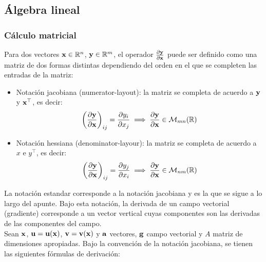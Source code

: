 \subsection{Álgebra lineal}

\subsubsection{Cálculo matricial}

Para dos vectores $\mathbf{x}\in\mathbb{R}^n$, $\mathbf{y}\in\mathbb{R}^m$, el operador $\frac{\partial \mathbf{y}}{\partial \mathbf{x}}$ puede ser definido como una matriz de dos formas distintas dependiendo del orden en el que se completen las entradas de la matriz:

\begin{itemize}
	\item Notación jacobiana (numerator-layout): la matriz se completa de acuerdo a $\mathbf{y}$ y $\mathbf{x}^\top $, es decir:
	\begin{equation*}
		\left(\frac{\partial \mathbf{y}}{\partial \mathbf{x}}\right)_{ij} = \frac{\partial y_i}{\partial x_j} \implies \frac{\partial \mathbf{y}}{\partial \mathbf{x}}\in \mathcal{M}_{mn}(\mathbb{R})
	\end{equation*}
	
	\item Notación hessiana (denominator-layour): la matriz se completa de acuerdo a $x$ e $y^\top $, es decir:
	\begin{equation*}
		\left(\frac{\partial \mathbf{y}}{\partial \mathbf{x}}\right)_{ij} = \frac{\partial y_j}{\partial x_i} \implies \frac{\partial \mathbf{y}}{\partial \mathbf{x}}\in \mathcal{M}_{nm}(\mathbb{R})
	\end{equation*}
	
\end{itemize}


La notación estandar corresponde a la notación jacobiana y es la que se sigue a lo largo del apunte. Bajo esta notación, la derivada de un campo vectorial (gradiente) corresponde a un vector vertical cuyas componentes son las derivadas de las componentes del campo.\\

Sean $\mathbf{x}$, $\bf{u}=\bf{u}(\mathbf{x})$, $\bf{v}=\bf{v}(\mathbf{x})$ y $\bf{a}$ vectores, $\bf{g}$ campo vectorial y $A$ matriz de dimensiones apropiadas. Bajo la convención de la notación jacobiana, se tienen las siguientes fórmulas de derivación:

